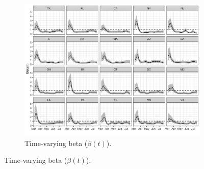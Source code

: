 \documentclass[11pt]{amsart}
\begin{document}
\begin{figure}
  \centering
     \begin{subfigure}{1\textwidth}
  \centering
    \includegraphics[scale=.15]{beta_t_plot.png}
    \caption{Time-varying beta ($\beta(t)$).}
\end{subfigure}


\end{figure}
\end{document}
